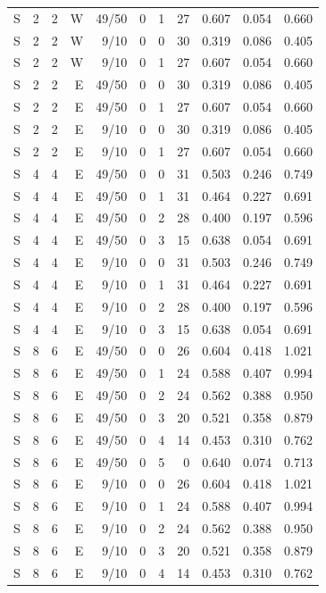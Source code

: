 \begin{longtable}{rrrrrrrrrrr}
S & 2 & 2 & W & 49/50 & 0 & 1 & 27 & 0.607 & 0.054 & 0.660 \\
S & 2 & 2 & W & 9/10 & 0 & 0 & 30 & 0.319 & 0.086 & 0.405 \\
S & 2 & 2 & W & 9/10 & 0 & 1 & 27 & 0.607 & 0.054 & 0.660 \\
S & 2 & 2 & E & 49/50 & 0 & 0 & 30 & 0.319 & 0.086 & 0.405 \\
S & 2 & 2 & E & 49/50 & 0 & 1 & 27 & 0.607 & 0.054 & 0.660 \\
S & 2 & 2 & E & 9/10 & 0 & 0 & 30 & 0.319 & 0.086 & 0.405 \\
S & 2 & 2 & E & 9/10 & 0 & 1 & 27 & 0.607 & 0.054 & 0.660 \\
S & 4 & 4 & E & 49/50 & 0 & 0 & 31 & 0.503 & 0.246 & 0.749 \\
S & 4 & 4 & E & 49/50 & 0 & 1 & 31 & 0.464 & 0.227 & 0.691 \\
S & 4 & 4 & E & 49/50 & 0 & 2 & 28 & 0.400 & 0.197 & 0.596 \\
S & 4 & 4 & E & 49/50 & 0 & 3 & 15 & 0.638 & 0.054 & 0.691 \\
S & 4 & 4 & E & 9/10 & 0 & 0 & 31 & 0.503 & 0.246 & 0.749 \\
S & 4 & 4 & E & 9/10 & 0 & 1 & 31 & 0.464 & 0.227 & 0.691 \\
S & 4 & 4 & E & 9/10 & 0 & 2 & 28 & 0.400 & 0.197 & 0.596 \\
S & 4 & 4 & E & 9/10 & 0 & 3 & 15 & 0.638 & 0.054 & 0.691 \\
S & 8 & 6 & E & 49/50 & 0 & 0 & 26 & 0.604 & 0.418 & 1.021 \\
S & 8 & 6 & E & 49/50 & 0 & 1 & 24 & 0.588 & 0.407 & 0.994 \\
S & 8 & 6 & E & 49/50 & 0 & 2 & 24 & 0.562 & 0.388 & 0.950 \\
S & 8 & 6 & E & 49/50 & 0 & 3 & 20 & 0.521 & 0.358 & 0.879 \\
S & 8 & 6 & E & 49/50 & 0 & 4 & 14 & 0.453 & 0.310 & 0.762 \\
S & 8 & 6 & E & 49/50 & 0 & 5 & 0 & 0.640 & 0.074 & 0.713 \\
S & 8 & 6 & E & 9/10 & 0 & 0 & 26 & 0.604 & 0.418 & 1.021 \\
S & 8 & 6 & E & 9/10 & 0 & 1 & 24 & 0.588 & 0.407 & 0.994 \\
S & 8 & 6 & E & 9/10 & 0 & 2 & 24 & 0.562 & 0.388 & 0.950 \\
S & 8 & 6 & E & 9/10 & 0 & 3 & 20 & 0.521 & 0.358 & 0.879 \\
S & 8 & 6 & E & 9/10 & 0 & 4 & 14 & 0.453 & 0.310 & 0.762 \\

\end{longtable}
